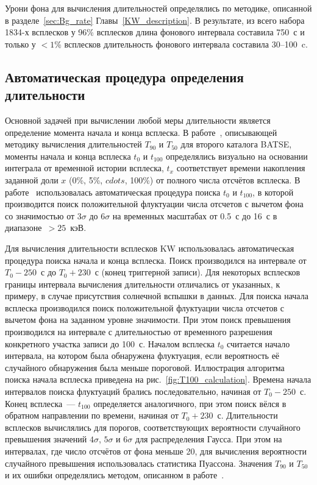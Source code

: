 Урони фона для вычисления длительностей определялись по методике, описанной в 
разделе~\ref{sec:Bg_rate} Главы~\ref{KW_description}. 
В результате, из всего набора 1834-х всплесков у 96\% всплесков длина 
фонового интервала составила 750~с и только у $<1$\% всплесков длительность фонового 
интервала составила 30--100~c.

\subsection{Автоматическая процедура определения длительности}
Основной задачей при вычислении любой меры длительности является определение момента 
начала и конца всплеска. В работе~\citep{Koshut_1996}, описывающей методику вычисления 
длительностей $T_{90}$ и $T_{50}$  для второго каталога BATSE, моменты начала и 
конца всплеска $t_{0}$ и $t_{100}$ определялись визуально на основании интеграла 
от временной истории всплеска, $t_{x}$ соответствует времени накопления заданной 
доли $x$  (0\%, 5\%, $cdots$, 100\%) от полного числа отсчётов всплеска. 
В работе~\citep{Bonnell_1997} использовалась автоматическая процедура поиска 
$t_{0}$ и $t_{100}$, в которой производится поиск положительной флуктуации числа 
отсчетов с вычетом фона со значимостью от $3\sigma$ до $6\sigma$ на временных 
масштабах от 0.5~с до 16~с в диапазоне~$>25$~кэВ.

Для вычисления длительности всплесков KW использовалась автоматическая 
процедура поиска начала и конца всплеска. Поиск производился на интервале от 
$T_0-250$~с до $T_0+230$~с (конец триггерной записи). Для некоторых всплесков 
границы интервала вычисления длительности отличались от указанных, к примеру, 
в случае присутствия солнечной вспышки в данных. Для поиска начала 
всплеска производился поиск положительной флуктуации числа отсчетов с вычетом 
фона на заданном уровне значимости. При этом поиск превышения производился на 
интервале с длительностью от временного разрешения конкретного участка записи до 100~с. 
Началом всплеска $t_0$ считается начало интервала, на котором была обнаружена флуктуация, 
если вероятность её случайного обнаружения была меньше пороговой. 
Иллюстрация алгоритма поиска начала всплеска приведена на рис.~\ref{fig:T100_calculation}.
Времена начала интервалов поиска флуктуаций брались последовательно, начиная от $T_0-250$~с. 
Конец всплеска~--- $t_{100}$ определяется аналогичного, при этом поиск вёлся в 
обратном направлении по времени, начиная от $T_0 + 230$~с. Длительности всплесков 
вычислялись для порогов, соответствующих вероятности случайного превышения 
значений $4\sigma$, $5\sigma$ и $6\sigma$ для распределения Гаусса. При этом на 
интервалах, где число отсчётов от фона меньше 20, для вычисления вероятности 
случайного превышения использовалась статистика Пуассона. Значения $T_{90}$ и $T_{50}$ 
и их ошибки определялись методом, описанном в работе~\citep{Koshut_1996}. 



